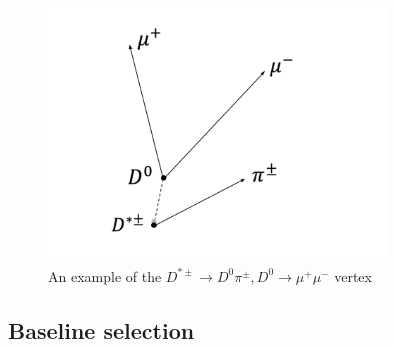 \begin{figure}[htbp]
    \centering
    \includegraphics[width=0.8\textwidth]{figures/chapter4/vertex_reconstruction.png}
    \caption{An example of the $D^{*\pm} \to D^0 \pi^\pm, D^0 \to \mu^+ \mu^-$ vertex}
    \label{fig:vertex_reconstruction}
\end{figure}

\subsection{Baseline selection}

